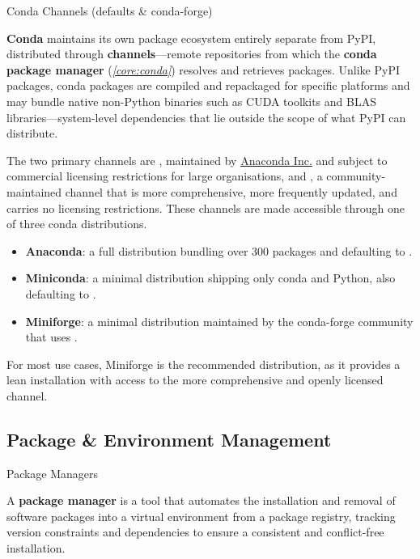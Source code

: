 \documentclass[10pt]{article}
\begin{document}
    \begin{core}[label=core:conda_channels]{Conda Channels (defaults \& conda-forge)}

      \textbf{Conda} maintains its own package ecosystem entirely separate from PyPI, distributed through \textbf{channels}---remote repositories from which the \textbf{conda package manager} (\textit{\autoref{core:conda}}) resolves and retrieves packages. Unlike PyPI packages, conda packages are compiled and repackaged for specific platforms and may bundle native non-Python binaries such as CUDA toolkits and BLAS libraries---system-level dependencies that lie outside the scope of what PyPI can distribute.

      The two primary channels are , maintained by \href{https://anaconda.org/}{Anaconda Inc.} and subject to commercial licensing restrictions for large organisations, and , a community-maintained channel that is more comprehensive, more frequently updated, and carries no licensing restrictions. These channels are made accessible through one of three conda distributions.

      \begin{itemize}
        
        \item \textbf{Anaconda}: a full distribution bundling over 300 packages and defaulting to .

        \item \textbf{Miniconda}: a minimal distribution shipping only conda and Python, also defaulting to .

        \item \textbf{Miniforge}: a minimal distribution maintained by the conda-forge community that uses . 

      \end{itemize}

      For most use cases, Miniforge is the recommended distribution, as it provides a lean installation with access to the more comprehensive and openly licensed  channel.

    \end{core}

  \subsection{Package \& Environment Management}

    \begin{core}[label=core:pack_man]{Package Managers}

      A \textbf{package manager} is a tool that automates the installation and removal of software packages into a virtual environment from a package registry, tracking version constraints and dependencies to ensure a consistent and conflict-free installation.

    \end{core}
\end{document}
